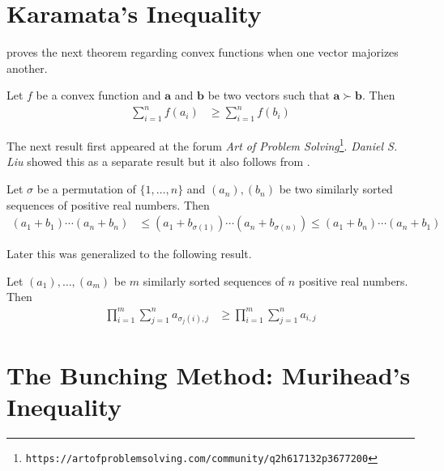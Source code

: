 \documentclass[inequalities.tex]{subfile}
\begin{document}
	\section[Karamata]{Karamata's Inequality}\label{sec:karamata}
	\textcite{karamata_1932} proves the next theorem regarding convex functions when one vector majorizes another.
		\begin{theorem}\label{thm:karamata}
			Let $f$ be a convex function and $\mathbf{a}$ and $\mathbf{b}$ be two vectors such that $\mathbf{a}\succ\mathbf{b}$. Then
				\begin{align*}
					\sum_{i=1}^{n}f(a_{i})
						& \geq \sum_{i=1}^{n}f(b_{i})
				\end{align*}
		\end{theorem}
	The next result first appeared at the forum \textit{Art of Problem Solving}\footnote{\texttt{https://artofproblemsolving.com/community/q2h617132p3677200}}. \textit{Daniel S. Liu} showed this as a separate result but it also follows from .
		\begin{theorem}\label{thm:reverse}
			Let $\sigma$ be a permutation of $\{1,\ldots,n\}$ and $(a_{n}),(b_{n})$ be two similarly sorted sequences of positive real numbers. Then
				\begin{align*}
					(a_{1}+b_{1})\cdots(a_{n}+b_{n})
						& \leq (a_{1}+b_{\sigma(1)})\cdots(a_{n}+b_{\sigma(n)})\leq(a_{1}+b_{n})\cdots(a_{n}+b_{1})
				\end{align*}
		\end{theorem}
	Later this was generalized to the following result.
		\begin{theorem}\label{thm:genreverse}
			Let $(a_{1}),\ldots,(a_{m})$ be $m$ similarly sorted sequences of $n$ positive real numbers. Then
				\begin{align*}
					\prod_{i=1}^{m}\sum_{j=1}^{n}a_{\sigma_{j}(i),j}
						& \geq \prod_{i=1}^{m}\sum_{j=1}^{n}a_{i,j}
				\end{align*}
		\end{theorem}
	\section[Bunching: Muirhead]{The Bunching Method: Murihead's Inequality}\label{sec:bunching}
	
\end{document}
